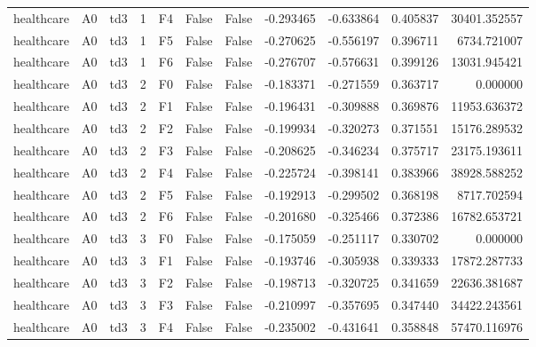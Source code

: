 \begin{tabular}{lllrlllrrrr}
healthcare &      A0 &       td3 &     1 &  F4 &           False &            False & -0.293465 & -0.633864 & 0.405837 &     30401.352557 \\
healthcare &      A0 &       td3 &     1 &  F5 &           False &            False & -0.270625 & -0.556197 & 0.396711 &      6734.721007 \\
healthcare &      A0 &       td3 &     1 &  F6 &           False &            False & -0.276707 & -0.576631 & 0.399126 &     13031.945421 \\
healthcare &      A0 &       td3 &     2 &  F0 &           False &            False & -0.183371 & -0.271559 & 0.363717 &         0.000000 \\
healthcare &      A0 &       td3 &     2 &  F1 &           False &            False & -0.196431 & -0.309888 & 0.369876 &     11953.636372 \\
healthcare &      A0 &       td3 &     2 &  F2 &           False &            False & -0.199934 & -0.320273 & 0.371551 &     15176.289532 \\
healthcare &      A0 &       td3 &     2 &  F3 &           False &            False & -0.208625 & -0.346234 & 0.375717 &     23175.193611 \\
healthcare &      A0 &       td3 &     2 &  F4 &           False &            False & -0.225724 & -0.398141 & 0.383966 &     38928.588252 \\
healthcare &      A0 &       td3 &     2 &  F5 &           False &            False & -0.192913 & -0.299502 & 0.368198 &      8717.702594 \\
healthcare &      A0 &       td3 &     2 &  F6 &           False &            False & -0.201680 & -0.325466 & 0.372386 &     16782.653721 \\
healthcare &      A0 &       td3 &     3 &  F0 &           False &            False & -0.175059 & -0.251117 & 0.330702 &         0.000000 \\
healthcare &      A0 &       td3 &     3 &  F1 &           False &            False & -0.193746 & -0.305938 & 0.339333 &     17872.287733 \\
healthcare &      A0 &       td3 &     3 &  F2 &           False &            False & -0.198713 & -0.320725 & 0.341659 &     22636.381687 \\
healthcare &      A0 &       td3 &     3 &  F3 &           False &            False & -0.210997 & -0.357695 & 0.347440 &     34422.243561 \\
healthcare &      A0 &       td3 &     3 &  F4 &           False &            False & -0.235002 & -0.431641 & 0.358848 &     57470.116976 \\

\end{tabular}
